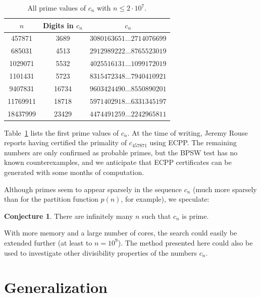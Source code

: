 \documentclass{amsart}
\theoremstyle{definition}
\newtheorem{conjecture}[theorem]{Conjecture}
\theoremstyle{remark}
\begin{document}
\begin{table}
\begin{center}
\caption{All prime values of $c_n$ with $n \le 2 \cdot 10^7$.}
\label{tab:primes}
\renewcommand{\baselinestretch}{1.25}
\begin{small}
\begin{tabular}{ c | c | c } 
$n$  & Digits in $c_n$ & $c_n$ \\ \hline
457871 & 3689 & $3080163651 \ldots 2714076699$ \\
685031 & 4513 & $2912989222 \ldots 8765523019$ \\
1029071 & 5532 & $4025516131 \ldots 1099172019$ \\
1101431 & 5723 & $8315472348 \ldots 7940410921$ \\
9407831 & 16734 & $9603424490 \ldots 8550890201$ \\
11769911 & 18718 & $5971402918 \ldots 6331345197$ \\
18437999 & 23429 & $4474491259 \ldots 2242965811$ \\
\end{tabular}
\end{small}
\end{center}
\end{table}

Table~\ref{tab:primes} lists the first prime values of $c_n$.
At the time of writing, Jeremy Rouse reports having
certified the primality of $c_{457871}$ using ECPP.
The remaining numbers are only confirmed as probable primes,
but the BPSW test has no known counterexamples,
and we anticipate that ECPP certificates can
be generated with some months of computation.

Although primes seem to appear sparsely in the sequence $c_n$ (much more sparsely than for the
partition function $p(n)$, for example), we speculate:

\begin{conjecture}
There are infinitely many $n$ such that $c_n$ is prime.
\end{conjecture}

With more memory and a large number of cores, the search could easily be extended
further (at least to $n = 10^9$). The method presented here could also be used
to investigate other divisibility properties of the numbers $c_n$.

\section{Generalization}
\end{document}
